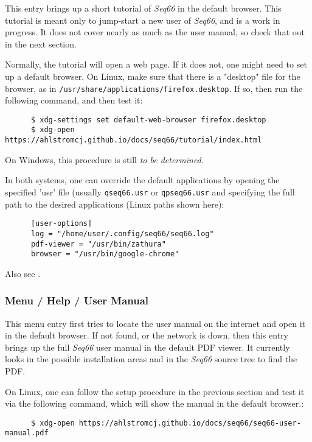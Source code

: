    This entry brings up a short tutorial of \textsl{Seq66} in the default
   browser. This tutorial is meant only to jump-start a new user of
   \textsl{Seq66}, and is a work in progress.
   It does not cover nearly as much as the user manual, so check that out in
   the next section.

   Normally, the tutorial will open a web page.  If it does not, one might need
   to set up a default browser.  On Linux, make sure that there is a "desktop"
   file for the browser, as in
   \texttt{/usr/share/applications/firefox.desktop}.
   If so, then run the following command, and then test it:

   \begin{verbatim}
      $ xdg-settings set default-web-browser firefox.desktop
      $ xdg-open https://ahlstromcj.github.io/docs/seq66/tutorial/index.html 
   \end{verbatim}

   On Windows, this procedure is still \textsl{to be determined}.

   In both systems, one can override the default applications by opening
   the specified 'usr' file (usually \texttt{qseq66.usr} or
   \texttt{qpseq66.usr} and specifying the full path to the desired
   applications (Linux paths shown here):

   \begin{verbatim}
      [user-options]
      log = "/home/user/.config/seq66/seq66.log"
      pdf-viewer = "/usr/bin/zathura"
      browser = "/usr/bin/google-chrome"
   \end{verbatim}

   Also see .

\subsubsection{Menu / Help / User Manual}
\label{subsubsec:menu_help_user_manual}

   This menu entry first tries to locate the user manual on the internet and
   open it in the default browser. If not found, or the network is down,
   then this entry brings up the full \textsl{Seq66} user manual in the default
   PDF viewer.  It currently looks in the possible installation areas and in
   the \textsl{Seq66} source tree to find the PDF.

   On Linux, one can follow the setup procedure in the previous section and
   test it via the following command, which will show the manual in the default
   browser.:

   \begin{verbatim}
      $ xdg-open https://ahlstromcj.github.io/docs/seq66/seq66-user-manual.pdf
   \end{verbatim}

